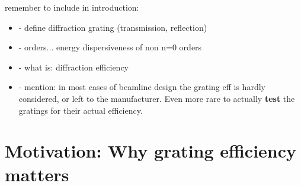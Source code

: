 remember to include in introduction:
\begin{itemize}
\item - define diffraction grating (transmission, reflection)
\item - orders... energy dispersiveness of non n=0 orders
\item - what is: diffraction efficiency
\item - mention: in most cases of beamline design the grating eff is hardly considered, or left to the manufacturer. Even more rare to actually \textbf{test} the gratings for their actual efficiency.
\end{itemize}

\chapter{Motivation: Why grating efficiency matters}

